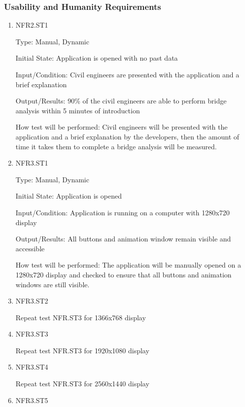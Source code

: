 \documentclass[12pt, titlepage]{article}
\begin{document}
\subsubsection{Usability and Humanity Requirements}
		
\begin{enumerate}

\item{NFR2.ST1\\}

Type: Manual, Dynamic

Initial State: Application is opened with no past data

Input/Condition: Civil engineers are presented with the application and a brief explanation

Output/Results: 90\% of the civil engineers are able to perform bridge analysis within 5 minutes of introduction

How test will be performed: Civil engineers will be presented with the application and a brief explanation by the developers, then the amount of time it takes them to complete a bridge analysis will be measured.

\item{NFR3.ST1\\}

Type: Manual, Dynamic

Initial State: Application is opened

Input/Condition: Application is running on a computer with 1280x720 display

Output/Results: All buttons and animation window remain visible and accessible

How test will be performed: The application will be manually opened on a 1280x720 display and checked to ensure that all buttons and animation windows are still visible.

\item{NFR3.ST2\\}

Repeat test NFR.ST3 for 1366x768 display

\item{NFR3.ST3\\}

Repeat test NFR.ST3 for 1920x1080 display

\item{NFR3.ST4\\}

Repeat test NFR.ST3 for 2560x1440 display

\item{NFR3.ST5\\}


\end{enumerate}
\end{document}
